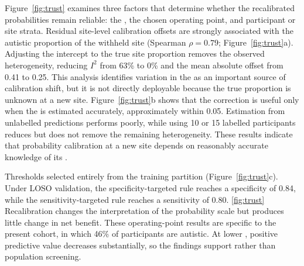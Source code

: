 Figure~\ref{fig:trust} examines three factors that determine whether the recalibrated probabilities remain reliable: the , the chosen operating point, and participant or site strata. Residual site-level calibration offsets are strongly associated with the autistic proportion of the withheld site (Spearman $\rho=0.79$; Figure~\ref{fig:trust}a). Adjusting the intercept to the true site proportion removes the observed heterogeneity, reducing $I^2$ from 63\% to 0\% and the mean absolute offset from 0.41 to 0.25. This analysis identifies variation in the  as an important source of calibration shift, but it is not directly deployable because the true proportion is unknown at a new site. Figure~\ref{fig:trust}b shows that the correction is useful only when the  is estimated accurately, approximately within 0.05. Estimation from unlabelled predictions performs poorly, while using 10 or 15 labelled participants reduces but does not remove the remaining heterogeneity. These results indicate that probability calibration at a new site depends on reasonably accurate knowledge of its .

 Thresholds selected entirely from the training partition  (Figure~\ref{fig:trust}c). Under LOSO validation, the specificity-targeted rule reaches a specificity of 0.84, while the sensitivity-targeted rule reaches a sensitivity of 0.80. \ref{fig:trust} Recalibration changes the interpretation of the probability scale but produces little change in net benefit. These operating-point results are specific to the present cohort, in which 46\% of participants are autistic. At lower , positive predictive value decreases substantially, so the findings support  rather than population screening. 

